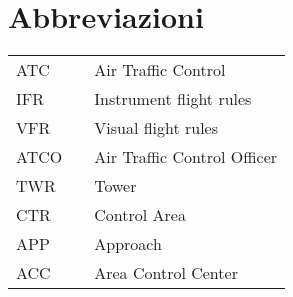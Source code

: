 \cleardoublepage %
\chapter*{Abbreviazioni} %


\begin{tabular}{lll}
    ATC & \hspace{3cm} & Air Traffic Control \\
    IFR & \hspace{3cm} & Instrument flight rules \\
    VFR & \hspace{3cm} & Visual flight rules \\
    ATCO & \hspace{3cm} & Air Traffic Control Officer \\
    TWR & \hspace{3cm} & Tower \\
    CTR & \hspace{3cm} & Control Area \\
    APP & \hspace{3cm} & Approach \\
    ACC & \hspace{3cm} & Area Control Center \\

\end{tabular}
